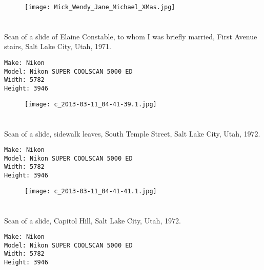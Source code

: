 \documentclass[11pt,letter,DIV=14,paper=landscape]{scrbook}
\begin{document}
\begin{figure}
\texttt{[image: Mick\_Wendy\_Jane\_Michael\_XMas.jpg]}
\end{figure}
 
\clearpage
\section{\protect{}}

\noindent Scan of a slide of Elaine Constable, to whom I was briefly married, First Avenue stairs, Salt Lake City, Utah, 1971.
\noindent
\begin{lstlisting}
Make: Nikon
Model: Nikon SUPER COOLSCAN 5000 ED
Width: 5782
Height: 3946
\end{lstlisting}
\clearpage
\begin{figure}
\texttt{[image: c\_2013-03-11\_04-41-39.1.jpg]}
\end{figure}

\clearpage
\section{\protect{}}
\noindent Scan of a slide, sidewalk leaves, South Temple Street, Salt Lake City, Utah, 1972.
\noindent
\begin{lstlisting}
Make: Nikon
Model: Nikon SUPER COOLSCAN 5000 ED
Width: 5782
Height: 3946
\end{lstlisting}
\clearpage

\begin{figure}
\texttt{[image: c\_2013-03-11\_04-41-41.1.jpg]}
\end{figure}

\clearpage
\section{\protect{}}
\noindent Scan of a slide, Capitol Hill, Salt Lake City, Utah, 1972.
\noindent
\begin{lstlisting}
Make: Nikon
Model: Nikon SUPER COOLSCAN 5000 ED
Width: 5782
Height: 3946
\end{lstlisting}
\clearpage
\end{document}
